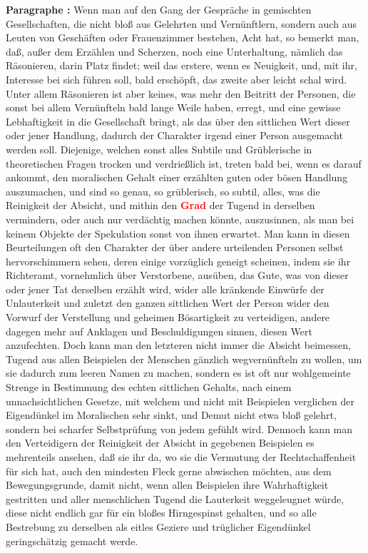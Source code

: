 \documentclass[a4paper,12pt,twoside]{book}
\newcommand{\match}[1]{\textcolor{red}{\textbf{#1}}}
\begin{document}
	\textbf{Paragraphe : }Wenn man auf den Gang der Gespräche in gemischten Gesellschaften, die nicht bloß aus Gelehrten und Vernünftlern, sondern auch aus Leuten von Geschäften oder Frauenzimmer bestehen, Acht hat, so bemerkt man, daß, außer dem Erzählen und Scherzen, noch eine Unterhaltung, nämlich das Räsonieren, darin Platz findet; weil das erstere, wenn es Neuigkeit, und, mit ihr, Interesse bei sich führen soll, bald erschöpft, das zweite aber leicht schal wird. Unter allem Räsonieren ist aber keines, was mehr den Beitritt der Personen, die sonst bei allem Vernünfteln bald lange Weile haben, erregt, und eine gewisse Lebhaftigkeit in die Gesellschaft bringt, als das über den sittlichen Wert dieser oder jener Handlung, dadurch der Charakter irgend einer Person ausgemacht werden soll. Diejenige, welchen sonst alles Subtile und Grüblerische in theoretischen Fragen trocken und verdrießlich ist, treten bald bei, wenn es darauf ankommt, den moralischen Gehalt einer erzählten guten oder bösen Handlung auszumachen, und sind so genau, so grüblerisch, so subtil, alles, was die Reinigkeit der Absicht, und mithin  den \match{Grad} der Tugend in derselben vermindern, oder auch nur verdächtig machen könnte, auszusinnen, als man bei keinem Objekte der Spekulation sonst von ihnen erwartet. Man kann in diesen Beurteilungen oft den Charakter der über andere urteilenden Personen selbst hervorschimmern sehen, deren einige vorzüglich geneigt scheinen, indem sie ihr Richteramt, vornehmlich über Verstorbene, ausüben, das Gute, was von dieser oder jener Tat derselben erzählt wird, wider alle kränkende Einwürfe der Unlauterkeit und zuletzt den ganzen sittlichen Wert der Person wider den Vorwurf der Verstellung und geheimen Bösartigkeit zu verteidigen, andere dagegen mehr auf Anklagen und Beschuldigungen sinnen, diesen Wert anzufechten. Doch kann man den letzteren nicht immer die Absicht beimessen, Tugend aus allen Beispielen der Menschen gänzlich wegvernünfteln zu wollen, um sie dadurch zum leeren Namen zu machen, sondern es ist oft nur wohlgemeinte Strenge in Bestimmung des echten sittlichen Gehalts, nach einem unnachsichtlichen Gesetze, mit welchem und nicht mit Beispielen verglichen der Eigendünkel im Moralischen sehr sinkt, und Demut nicht etwa bloß gelehrt, sondern bei scharfer Selbstprüfung von jedem gefühlt wird. Dennoch kann man den Verteidigern der Reinigkeit der Absicht in gegebenen Beispielen es mehrenteils ansehen, daß sie ihr da, wo sie die Vermutung der Rechtschaffenheit für sich hat, auch den mindesten Fleck gerne abwischen möchten, aus dem Bewegungsgrunde, damit nicht, wenn allen Beispielen ihre Wahrhaftigkeit gestritten und aller menschlichen Tugend die Lauterkeit weggeleugnet würde, diese nicht endlich gar für ein bloßes Hirngespinst gehalten, und so alle Bestrebung zu derselben als eitles Geziere und trüglicher Eigendünkel geringschätzig gemacht werde. 
	
\end{document}
